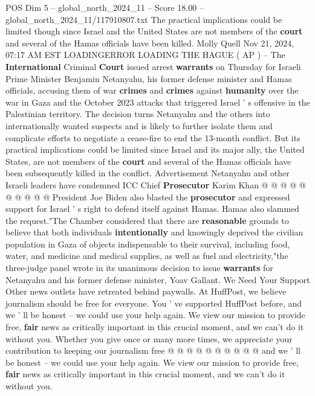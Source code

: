 \begin{textsample}{POS Dim 5 – global\_north\_2024\_11 – Score 18.00 – global\_north\_2024\_11/117910807.txt}  \label{ex:f5_pos_036}
The practical implications could be limited though since Israel and the United States are not members of the \textbf{court} and several of the Hamas officials have been killed.
Molly Quell Nov 21, 2024, 07:17 AM EST LOADINGERROR LOADING THE HAGUE ( AP ) -- The \textbf{International} Criminal \textbf{Court} issued arrest \textbf{warrants} on Thursday for Israeli Prime Minister Benjamin Netanyahu, his former defense minister and Hamas officials, accusing them of war \textbf{crimes} and \textbf{crimes} against \textbf{humanity} over the war in Gaza and the October 2023 attacks that triggered Israel ' s offensive in the Palestinian territory.
The decision turns Netanyahu and the others into internationally wanted suspects and is likely to further isolate them and complicate efforts to negotiate a cease-fire to end the 13-month conflict.
But its practical implications could be limited since Israel and its major ally, the United States, are not members of the \textbf{court} and several of the Hamas officials have been subsequently killed in the conflict.
Advertisement Netanyahu and other Israeli leaders have condemned ICC Chief \textbf{Prosecutor} Karim Khan @ @ @ @ @ @ @ @ @ @ President Joe Biden also blasted the \textbf{prosecutor} and expressed support for Israel ' s right to defend itself against Hamas.
Hamas also slammed the request."The Chamber considered that there are \textbf{reasonable} grounds to believe that both individuals \textbf{intentionally} and knowingly deprived the civilian population in Gaza of objects indispensable to their survival, including food, water, and medicine and medical supplies, as well as fuel and electricity,"the three-judge panel wrote in its unanimous decision to issue \textbf{warrants} for Netanyahu and his former defense minister, Yoav Gallant.
We Need Your Support Other news outlets have retreated behind paywalls.
At HuffPost, we believe journalism should be free for everyone.
You ' ve supported HuffPost before, and we ' ll be honest -- we could use your help again.
We view our mission to provide free, \textbf{fair} news as critically important in this crucial moment, and we can't do it without you.
Whether you give once or many more times, we appreciate your contribution to keeping our journalism free @ @ @ @ @ @ @ @ @ @ and we ' ll be honest -- we could use your help again.
We view our mission to provide free, \textbf{fair} news as critically important in this crucial moment, and we can't do it without you.

\end{textsample}
